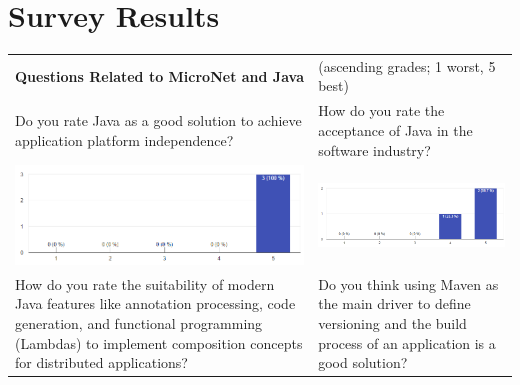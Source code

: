 \chapter{Survey Results}
\label{survey_results}

\begin{center}
  \hspace*{-1.9cm}
  \begin{tabular}{ p{8.7cm} p{8.7cm} }
  	\textbf{Questions Related to MicroNet and Java} & 
  	(ascending grades; 1 worst, 5 best) \\[1cm]
  
    Do you rate Java as a good solution to achieve application platform
    independence? &
    How do you rate the acceptance of Java in the software industry?\\
    
    \includegraphics[width=\linewidth]{images/survey/java1}
    &
    \includegraphics[width=\linewidth]{images/survey/java2}\\[1cm]
    
    How do you rate the suitability of modern Java features like annotation
    processing, code generation, and functional programming (Lambdas) to
    implement composition concepts for distributed applications? & 
    Do you think using Maven as the main driver to define versioning and the
    build process of an application is a good solution?\\
    

\end{tabular}
\end{center}

